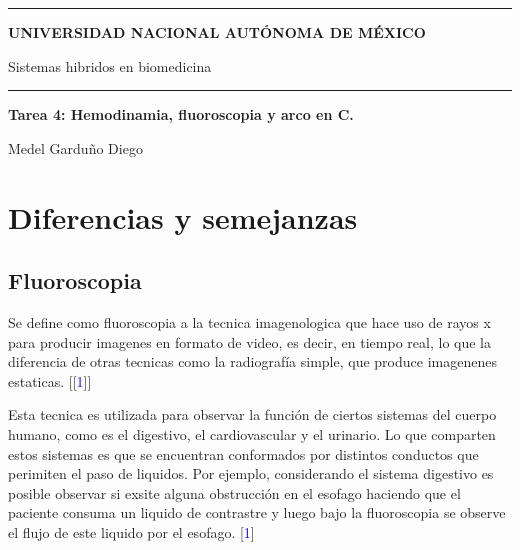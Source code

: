 \documentclass{article}
\begin{document}
\thispagestyle{plain}


\hrule
\begin{center}
    {\Large \textbf{UNIVERSIDAD NACIONAL AUTÓNOMA DE MÉXICO}}
    \vspace{10pt}

    {\Large{{Sistemas hibridos en biomedicina}}}
    
    
    \vspace{10pt}

    \hrule

    \vspace{20pt}


    {\Huge \textbf{Tarea 4: Hemodinamia, fluoroscopia y arco en C.}}\\
\end{center}

\hdashrule{\linewidth}{1pt}{1mm}

\begin{flushright}
    {\small Medel Garduño Diego} 
\end{flushright}



\section{Diferencias y semejanzas}


\subsection{Fluoroscopia}

Se define como fluoroscopia a la tecnica imagenologica que hace uso de rayos x para producir imagenes en formato de video, es decir, en tiempo real, lo que la diferencia de otras tecnicas como la radiografía simple, que produce imagenenes estaticas. [[\textcolor{blue}{1}]]

\vspace{10pt}


Esta tecnica es utilizada para observar la función de ciertos sistemas del cuerpo humano, como es el digestivo, el cardiovascular y el urinario. Lo que comparten estos sistemas es que se encuentran conformados por distintos conductos que perimiten el paso de liquidos. Por ejemplo, considerando el sistema digestivo es posible observar si exsite alguna obstrucción en el esofago haciendo que el paciente consuma un liquido de contrastre y luego bajo la fluoroscopia se observe el flujo de este liquido por el esofago. [\textcolor{blue}{1}]
\end{document}
